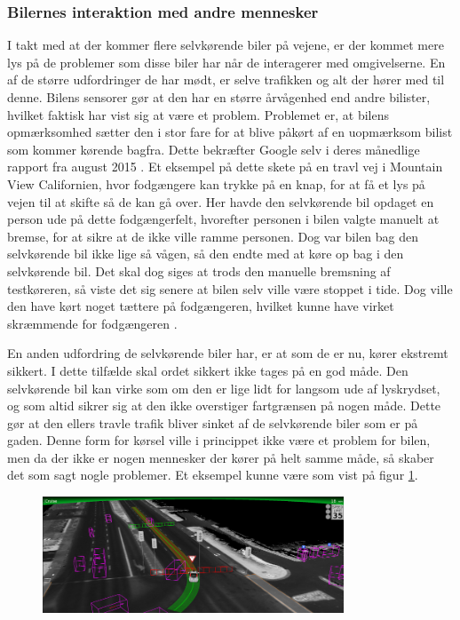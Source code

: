 \subsubsection{Bilernes interaktion med andre mennesker}
\label{interaktion}

I takt med at der kommer flere selvkørende biler på vejene, er der kommet mere lys på de problemer som disse biler har når de interagerer med omgivelserne. En af de større udfordringer de har mødt, er selve trafikken og alt der hører med til denne. Bilens sensorer gør at den har en større årvågenhed end andre bilister, hvilket faktisk har vist sig at være et problem. Problemet er, at bilens opmærksomhed sætter den i stor fare for at blive påkørt af en uopmærksom bilist som kommer kørende bagfra. Dette bekræfter Google selv i deres månedlige rapport fra august 2015 \cite{GOOG_MONTHLY}. Et eksempel på dette skete på en travl vej i Mountain View Californien, hvor fodgængere kan trykke på en knap, for at få et lys på vejen til at skifte så de kan gå over. Her havde den selvkørende bil opdaget en person ude på dette fodgængerfelt, hvorefter personen i bilen valgte manuelt at bremse, for at sikre at de ikke ville ramme personen. Dog var bilen bag den selvkørende bil ikke lige så vågen, så den endte med at køre op bag i den selvkørende bil. Det skal dog siges at trods den manuelle bremsning af testkøreren, så viste det sig senere at bilen selv ville være stoppet i tide. Dog ville den have kørt noget tættere på fodgængeren, hvilket kunne have virket skræmmende for fodgængeren \cite{GOOG_MONTHLY}. 

En anden udfordring de selvkørende biler har, er at som de er nu, kører ekstremt sikkert. I dette tilfælde skal ordet sikkert ikke tages på en god måde. Den selvkørende bil kan virke som om den er lige lidt for langsom ude af lyskrydset, og som altid sikrer sig at den ikke overstiger fartgrænsen på nogen måde. Dette gør at den ellers travle trafik bliver sinket af de selvkørende biler som er på gaden. Denne form for kørsel ville i princippet ikke være et problem for bilen, men da der ikke er nogen mennesker der kører på helt samme måde, så skaber det som sagt nogle problemer. Et eksempel kunne være som vist på figur \ref{fig:car_vision}.

\begin{figure}[h!]
    \centering
    \includegraphics[width=0.8\textwidth]{images/google_vision.png}
    \label{fig:car_vision}
\end{figure}

